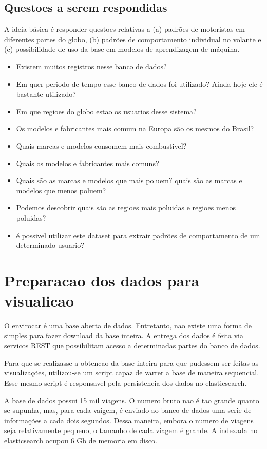 \documentclass[10pt, conference]{IEEEtran}
\begin{document}
\subsection{Questoes a serem respondidas}

A ideia básica é responder questoes relativas a (a) padrões de motoristas
em diferentes partes do globo, (b) padrões de comportamento individual no
volante e (c) possibilidade de uso da base em modelos de aprendizagem de máquina.

\begin{itemize}
  \item Existem muitos registros nesse banco de dados?
  \item Em quer periodo de tempo esse banco de dados foi utilizado? Ainda hoje ele é bastante utilizado?
  \item Em que regioes do globo estao os usuarios desse sistema?
  \item Os modelos e fabricantes mais comum na Europa são os mesmos do Brasil?
  \item Quais marcas e modelos consomem mais combustivel?
  \item Quais os modelos e fabricantes mais comuns?
  \item Quais são as marcas e modelos que mais poluem? quais são as marcas e modelos que menos poluem?
  \item Podemos descobrir quais são as regioes mais poluidas e regioes menos poluidas?
  \item é possivel utilizar este dataset para extrair padrões de comportamento de um determinado usuario?
\end{itemize}


\section{Preparacao dos dados para visualicao}

O envirocar é uma base aberta de dados. Entretanto, nao existe uma forma de simples 
para fazer download da base inteira. A entrega dos dados é feita via servicos REST
que possibilitam acesso a determinadas partes do banco de dados.

Para que se realizasse a obtencao da base inteira para que pudessem ser feitas as 
visualizações, utilizou-se um script capaz de varrer a base de maneira sequencial. 
Esse mesmo script é responsavel pela persistencia dos dados no elasticsearch.

A base de dados possui 15 mil viagens. O numero bruto nao é tao grande quanto se supunha,
mas, para cada vaigem, é enviado ao banco de dados uma serie de informações a cada dois
segundos. Dessa maneira, embora o numero de viagens seja relativamente 
pequeno, o tamanho de cada viagem é grande. A indexada no elasticsearch 
ocupou 6 Gb de memoria em disco.
\end{document}
